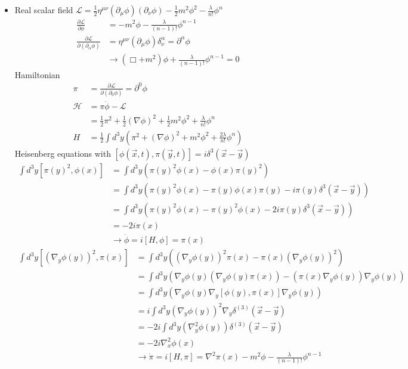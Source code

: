 \documentclass[../main.tex]{subfiles}
\begin{document}
\begin{itemize}
\item Real scalar field $\mathcal{L}=\frac{1}{2}\eta^{\mu\nu}(\partial_\mu\phi)(\partial_\nu\phi)-\frac{1}{2}m^2\phi^2-\frac{\lambda}{n!}\phi^n$
\begin{align}
\frac{\partial\mathcal{L}}{\partial\phi}&=-m^2\phi-\frac{\lambda}{(n-1)!}\phi^{n-1}\\
\frac{\partial\mathcal{L}}{\partial(\partial_\alpha\phi)}&=\eta^{\mu\nu}(\partial_\mu\phi)\delta^\alpha_\nu=\partial^\alpha\phi\\
&\rightarrow (\Box+m^2)\phi+\frac{\lambda}{(n-1)!}\phi^{n-1}=0
\end{align}
Hamiltonian
\begin{align}
\pi&=\frac{\partial\mathcal{L}}{\partial(\partial_0\phi)}=\partial^0\phi\\
\mathcal{H}&=\pi\dot\phi-\mathcal{L}\\
&=\frac{1}{2}\pi^2+\frac{1}{2}(\nabla\phi)^2+\frac{1}{2}m^2\phi^2+\frac{\lambda}{n!}\phi^n\\
H&=\frac{1}{2}\int d^3y\left(\pi^2+(\nabla\phi)^2+m^2\phi^2+\frac{2\lambda}{n!}\phi^n\right)
\end{align}
Heisenberg equations with $[\phi(\vec{x},t),\pi(\vec{y},t)]=i\delta^3(\vec{x}-\vec{y})$
\begin{align}
\int d^3y[\pi(y)^2,\phi(x)]
&=\int d^3y\left(\pi(y)^2\phi(x)-\phi(x)\pi(y)^2\right)\\
&=\int d^3y\left(\pi(y)^2\phi(x)-\pi(y)\phi(x)\pi(y)-i\pi(y)\delta^3(\vec{x}-\vec{y})\right)\\
&=\int d^3y\left(\pi(y)^2\phi(x)-\pi(y)^2\phi(x)-2i\pi(y)\delta^3(\vec{x}-\vec{y})\right)\\
&=-2i\pi(x)\\
&\rightarrow \dot\phi=i[H,\phi]=\pi(x)
\end{align}
\begin{align}
\int d^3y[(\nabla_y\phi(y))^2,\pi(x)]
&=\int d^3y\left((\nabla_y\phi(y))^2\pi(x)-\pi(x)(\nabla_y\phi(y))^2\right)\\
&=\int d^3y\left(\nabla_y\phi(y)(\nabla_y\phi(y)\pi(x))-(\pi(x)\nabla_y\phi(y))\nabla_y\phi(y)\right)\\
&=\int d^3y\left(\nabla_y\phi(y)\nabla_y[\phi(y),\pi(x)]\nabla_y\phi(y)\right)\\
&=i\int d^3y\left(\nabla_y\phi(y)\right)^2\nabla_y\delta^{(3)}(\vec{x}-\vec{y})\\
&=-2i\int d^3y\left(\nabla^2_y\phi(y)\right)\delta^{(3)}(\vec{x}-\vec{y})\\
&=-2i\nabla^2_x\phi(x)\\
&\rightarrow \dot\pi=i[H,\pi]=\nabla^2\pi(x)-m^2\phi-\frac{\lambda}{(n-1)!}\phi^{n-1}
\end{align}


\end{itemize}
\end{document}
